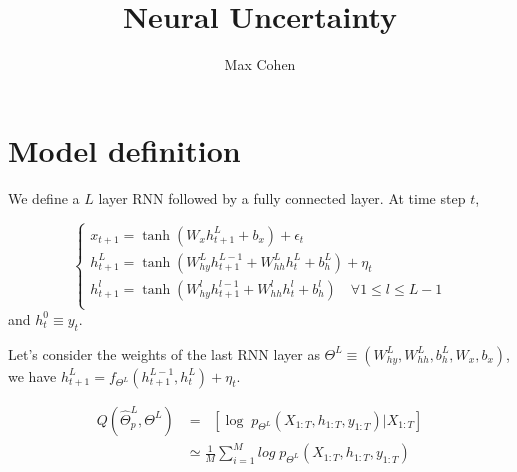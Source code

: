 \documentclass[11pt,a4paper]{report}
\begin{document}
\title{Neural Uncertainty}
\author{Max Cohen}
\maketitle

\chapter{Model definition}
We define a $L$ layer RNN followed by a fully connected layer. At time step $t$,


$$
    \left\{
    \begin{array}{ll}
        x_{t+1} = \tanh(W_x h_{t+1}^L + b_x) + \epsilon_t                                                            \\
        h_{t+1}^L = \tanh(W_{hy}^L h^{L-1}_{t+1} + W_{hh}^L h^{L}_{t} + b_h^L) + \eta_t \\

        h_{t+1}^l = \tanh(W_{hy}^l h^{l-1}_{t+1} + W_{hh}^l h^{l}_{t} + b_h^l) \quad \forall 1 \leq l \leq L-1 \\
    \end{array}
    \right.
$$
and $h_{t}^0 \equiv y_{t}$.

Let's consider the weights of the last RNN layer as $\Theta^L \equiv (W_{hy}^L, W_{hh}^L, b_h^L, W_x, b_x)$, we have
$h_{t+1}^L = f_{\Theta^L}(h_{t+1}^{L-1}, h_{t}^L) + \eta_t$.

\begin{align}
    Q(\hat \Theta^L_p, \Theta^L) & = \mathop{\mathbb{E}_{\hat \Theta^L_p}} \left[ \log \; p_{\Theta^L}(X_{1:T}, h_{1:T}, y_{1:T}) | X_{1:T} \right] \\
                                 & \simeq \frac{1}{M} \sum_{i=1}^M  log \; p_{\Theta^L}(X_{1:T}, h_{1:T}, y_{1:T})
\end{align}
\end{document}
